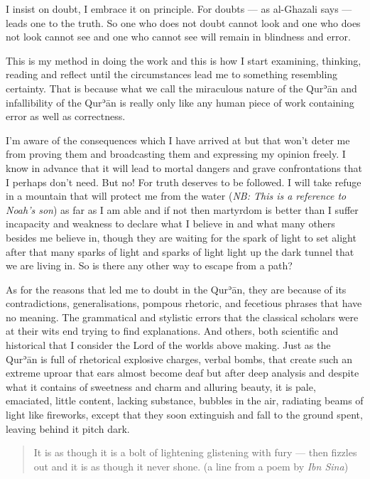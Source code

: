 \documentclass[12pt]{book}
\def \Quran{Qurʾān} %
\def \Qrn{\Quran}   %
\newcommand{\NB}[1]{\emph{\small NB: #1}}
\begin{document}
I insist on doubt, I embrace it on principle. For doubts — as al-Ghazali says —
leads one to the truth. So one who does not doubt cannot look and one who does
not look cannot see and one who cannot see will remain in blindness and error.

This is my method in doing the work and this is how I start examining,
thinking, reading and reflect until the circumstances lead me to something
resembling certainty. That is because what we call the miraculous nature of the
\Qrn{} and infallibility of the \Qrn{} is really only like any human piece of
work containing error as well as correctness.

I’m aware of the consequences which I have arrived at but that won’t deter me
from proving them and broadcasting them and expressing my opinion freely. I
know in advance that it will lead to mortal dangers and grave confrontations
that I perhaps don’t need. But no! For truth deserves to be followed. I will
take refuge in a mountain that will protect me from the water
(\NB{This is a reference to Noah’s son})
as far as I am able and if not then martyrdom is better than I suffer
incapacity and weakness to declare what I believe in and what many others
besides me believe in, though they are waiting for the spark of light to set
alight after that many sparks of light and sparks of light light up the dark
tunnel that we are living in. So is there any other way to escape from a path?

As for the reasons that led me to doubt in the \Quran, they are because of its
contradictions, generalisations, pompous rhetoric, and fecetious phrases that
have no meaning. The grammatical and stylistic errors that the classical
scholars were at their wits end trying to find explanations. And others, both
scientific and historical that I consider the Lord of the worlds above making.
Just as the \Qrn{} is full of rhetorical explosive charges, verbal bombs, that
create such an extreme uproar that ears almost become deaf but after deep
analysis and despite what it contains of sweetness and charm and alluring
beauty, it is pale, emaciated, little content, lacking substance, bubbles in
the air, radiating beams of light like fireworks, except that they soon
extinguish and fall to the ground spent, leaving behind it pitch dark.

\begin{quote}
It is as though it is a bolt of lightening glistening with fury — then fizzles
out and it is as though it never shone.
(a line from a poem by \emph{Ibn Sina})
\end{quote}
\end{document}
